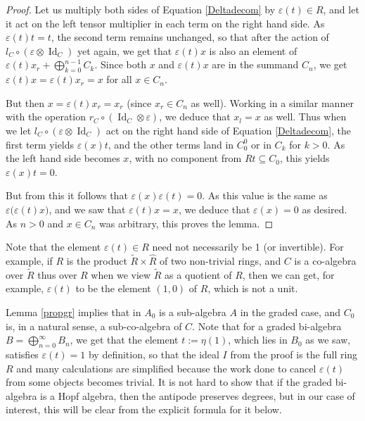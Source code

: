 \documentclass{article}
\theoremstyle{definition}
\begin{document}
\begin{proof}
Let us multiply both sides of Equation \eqref{Deltadecom} by $\varepsilon(t) \in R$, and let it act on the left tensor multiplier in each term on the right hand side. As $\varepsilon(t)t=t$, the second term remains unchanged, so that after the action of $l_{C}\circ(\varepsilon\otimes\operatorname{Id}_{C})$ yet again, we get that $\varepsilon(t)x$ is also an element of $\varepsilon(t)x_{r}+\bigoplus_{k=0}^{n-1}C_{k}$. Since both $x$ and $\varepsilon(t)x$ are in the summand $C_{n}$, we get $\varepsilon(t)x=\varepsilon(t)x_{r}=x$ for all $x \in C_{n}$.

But then $x=\varepsilon(t)x_{r}=x_{r}$ (since $x_{r} \in C_{n}$ as well). Working in a similar manner with the operation $r_{C}\circ(\operatorname{Id}_{C}\otimes\varepsilon)$, we deduce that $x_{l}=x$ as well. Thus when we let $l_{C}\circ(\varepsilon\otimes\operatorname{Id}_{C})$ act on the right hand side of Equation \eqref{Deltadecom}, the first term yields $\varepsilon(x)t$, and the other terms land in $C_{0}^{0}$ or in $C_{k}$ for $k>0$. As the left hand side becomes $x$, with no component from $Rt \subseteq C_{0}$, this yields $\varepsilon(x)t=0$.

But from this it follows that $\varepsilon(x)\varepsilon(t)=0$. As this value is the same as $\varepsilon\big(\varepsilon(t)x\big)$, and we saw that $\varepsilon(t)x=x$, we deduce that $\varepsilon(x)=0$ as desired. As $n>0$ and $x \in C_{n}$ was arbitrary, this proves the lemma.
\end{proof}
Note that the element $\varepsilon(t) \in R$ need not necessarily be 1 (or invertible). For example, if $R$ is the product $\tilde{R}\times\hat{R}$ of two non-trivial rings, and $C$ is a co-algebra over $\tilde{R}$ thus over $R$ when we view $\tilde{R}$ as a quotient of $R$, then we can get, for example, $\varepsilon(t)$ to be the element $(1,0)$ of $R$, which is not a unit.

\medskip

Lemma \ref{propgr} implies that in $A_{0}$ is a sub-algebra $A$ in the graded case, and $C_{0}$ is, in a natural sense, a sub-co-algebra of $C$. Note that for a graded bi-algebra $B=\bigoplus_{n=0}^{\infty}B_{n}$, we get that the element $t:=\eta(1)$, which lies in $B_{0}$ as we saw, satisfies $\varepsilon(t)=1$ by definition, so that the ideal $I$ from the proof is the full ring $R$ and many calculations are simplified because the work done to cancel $\varepsilon(t)$ from some objects becomes trivial. It is not hard to show that if the graded bi-algebra is a Hopf algebra, then the antipode preserves degrees, but in our case of interest, this will be clear from the explicit formula for it below.
\end{document}
